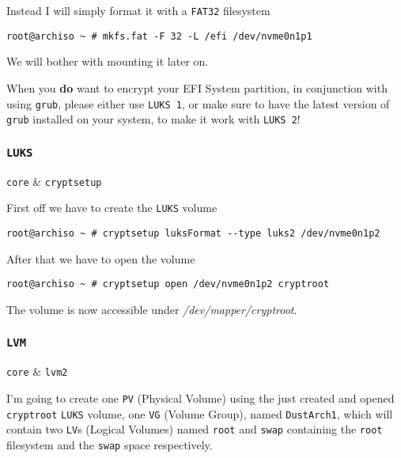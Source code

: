 \documentclass[10pt]{dustdoc}
\begin{document}
Instead I will simply format it with a \texttt{FAT32} filesystem

\begin{verbatim}
root@archiso ~ # mkfs.fat -F 32 -L /efi /dev/nvme0n1p1
\end{verbatim}

We will bother with mounting it later on.

\begin{NOTE}
    When you \textbf{do} want to encrypt your EFI System partition, in conjunction with using \texttt{grub}, please either use \texttt{LUKS 1}, or make sure to have the latest version of \texttt{grub} installed on your system, to make it work with \texttt{LUKS 2}!
\end{NOTE}

\subsubsection{\texttt{LUKS}}
\label{sec:luks}

\begin{packagetable}
    \texttt{core} & \texttt{cryptsetup} \\
\end{packagetable}

First off we have to create the \texttt{LUKS} volume

\begin{verbatim}
root@archiso ~ # cryptsetup luksFormat --type luks2 /dev/nvme0n1p2
\end{verbatim}

After that we have to open the volume

\begin{verbatim}
root@archiso ~ # cryptsetup open /dev/nvme0n1p2 cryptroot
\end{verbatim}

The volume is now accessible under \textit{/dev/mapper/cryptroot}.

\subsubsection{\texttt{LVM}}
\label{sec:lvm}

\begin{packagetable}
    \texttt{core} & \texttt{lvm2} \\
\end{packagetable}

I’m going to create one \texttt{PV} (Physical Volume) using the just created and opened \texttt{cryptroot} \texttt{LUKS} volume, one \texttt{VG} (Volume Group), named \texttt{DustArch1}, which will contain two \texttt{LV}s (Logical Volumes) named \texttt{root} and \texttt{swap} containing the \texttt{root} filesystem and the \texttt{swap} space respectively.
\end{document}
